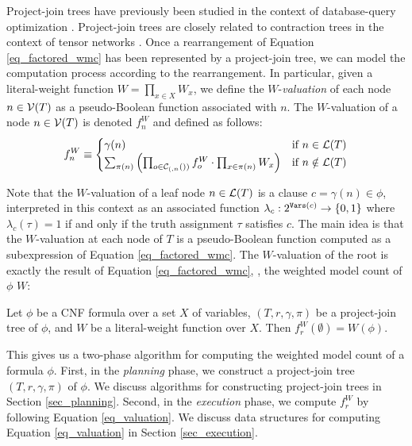 Project-join trees have previously been studied in the context of database-query optimization \cite{mcmahan2004projection}.
Project-join trees are closely related to contraction trees in the context of tensor networks \cite{evenbly2014improving,dudek2019efficient}.
Once a rearrangement of Equation \eqref{eq_factored_wmc} has been represented by a project-join tree, we can model the computation process according to the rearrangement.
In particular, given a literal-weight function $W = \prod_{x \in X} W_x$, we define the $W$-\emph{valuation} of each node $n \in \mathcal{V}(T)$ as a pseudo-Boolean function associated with $n$.
The $W$-valuation of a node $n \in \mathcal{V}(T)$ is denoted $f^W_n$ and defined as follows:
\begin{equation}
\label{eq_valuation}
    f^W_n \equiv
    \begin{cases}
       \gamma(n) & \text{if}~n \in \mathcal{L}(T) \\
        \sum_{\pi(n)} \left(  \prod_{o \in \mathcal{C}_{(,n}())} f^W_o \cdot \prod_{x \in \pi(n)} W_x  \right) & \text{if}~n \notin \mathcal{L}(T)
    \end{cases}
\end{equation}

Note that the $W$-valuation of a leaf node $n \in \mathcal{L}(T)$ is a clause $c = \gamma(n) \in \phi$, interpreted in this context as an associated function $\lambda_c : 2^{\texttt{\upshape Vars}(c)} \to \left\{ 0, 1 \right\}$ where $\lambda_c(\tau) = 1$ if and only if the truth assignment $\tau$ satisfies $c$.
The main idea is that the $W$-valuation at each node of $T$ is a pseudo-Boolean function computed as a subexpression of Equation \eqref{eq_factored_wmc}.
The $W$-valuation of the root is exactly the result of Equation \eqref{eq_factored_wmc}, \ie, the weighted model count of $\phi$ \wrt{} $W$:
\begin{theorem}
\label{thm_valuation_wmc}
    Let $\phi$ be a CNF formula over a set $X$ of variables, $(T, r, \gamma, \pi)$ be a project-join tree of $\phi$, and $W$ be a literal-weight function over $X$.
    Then $f^W_r(\emptyset) = W(\phi)$.
\end{theorem}

This gives us a two-phase algorithm for computing the weighted model count of a formula $\phi$.
First, in the \emph{planning} phase, we construct a project-join tree $(T, r, \gamma, \pi)$ of $\phi$.
We discuss algorithms for constructing project-join trees in Section \ref{sec_planning}.
Second, in the \emph{execution} phase, we compute $f^W_r$ by following Equation \eqref{eq_valuation}.
We discuss data structures for computing Equation \eqref{eq_valuation} in Section \ref{sec_execution}.

